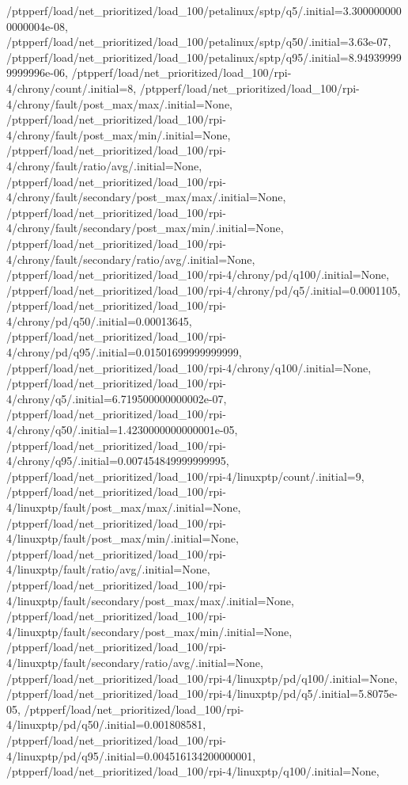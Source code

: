 {    /ptpperf/load/net_prioritized/load_100/petalinux/sptp/q5/.initial=3.3000000000000004e-08,
    /ptpperf/load/net_prioritized/load_100/petalinux/sptp/q50/.initial=3.63e-07,
    /ptpperf/load/net_prioritized/load_100/petalinux/sptp/q95/.initial=8.949399999999996e-06,
    /ptpperf/load/net_prioritized/load_100/rpi-4/chrony/count/.initial=8,
    /ptpperf/load/net_prioritized/load_100/rpi-4/chrony/fault/post_max/max/.initial=None,
    /ptpperf/load/net_prioritized/load_100/rpi-4/chrony/fault/post_max/min/.initial=None,
    /ptpperf/load/net_prioritized/load_100/rpi-4/chrony/fault/ratio/avg/.initial=None,
    /ptpperf/load/net_prioritized/load_100/rpi-4/chrony/fault/secondary/post_max/max/.initial=None,
    /ptpperf/load/net_prioritized/load_100/rpi-4/chrony/fault/secondary/post_max/min/.initial=None,
    /ptpperf/load/net_prioritized/load_100/rpi-4/chrony/fault/secondary/ratio/avg/.initial=None,
    /ptpperf/load/net_prioritized/load_100/rpi-4/chrony/pd/q100/.initial=None,
    /ptpperf/load/net_prioritized/load_100/rpi-4/chrony/pd/q5/.initial=0.0001105,
    /ptpperf/load/net_prioritized/load_100/rpi-4/chrony/pd/q50/.initial=0.00013645,
    /ptpperf/load/net_prioritized/load_100/rpi-4/chrony/pd/q95/.initial=0.01501699999999999,
    /ptpperf/load/net_prioritized/load_100/rpi-4/chrony/q100/.initial=None,
    /ptpperf/load/net_prioritized/load_100/rpi-4/chrony/q5/.initial=6.719500000000002e-07,
    /ptpperf/load/net_prioritized/load_100/rpi-4/chrony/q50/.initial=1.4230000000000001e-05,
    /ptpperf/load/net_prioritized/load_100/rpi-4/chrony/q95/.initial=0.007454849999999995,
    /ptpperf/load/net_prioritized/load_100/rpi-4/linuxptp/count/.initial=9,
    /ptpperf/load/net_prioritized/load_100/rpi-4/linuxptp/fault/post_max/max/.initial=None,
    /ptpperf/load/net_prioritized/load_100/rpi-4/linuxptp/fault/post_max/min/.initial=None,
    /ptpperf/load/net_prioritized/load_100/rpi-4/linuxptp/fault/ratio/avg/.initial=None,
    /ptpperf/load/net_prioritized/load_100/rpi-4/linuxptp/fault/secondary/post_max/max/.initial=None,
    /ptpperf/load/net_prioritized/load_100/rpi-4/linuxptp/fault/secondary/post_max/min/.initial=None,
    /ptpperf/load/net_prioritized/load_100/rpi-4/linuxptp/fault/secondary/ratio/avg/.initial=None,
    /ptpperf/load/net_prioritized/load_100/rpi-4/linuxptp/pd/q100/.initial=None,
    /ptpperf/load/net_prioritized/load_100/rpi-4/linuxptp/pd/q5/.initial=5.8075e-05,
    /ptpperf/load/net_prioritized/load_100/rpi-4/linuxptp/pd/q50/.initial=0.001808581,
    /ptpperf/load/net_prioritized/load_100/rpi-4/linuxptp/pd/q95/.initial=0.004516134200000001,
    /ptpperf/load/net_prioritized/load_100/rpi-4/linuxptp/q100/.initial=None,
}
